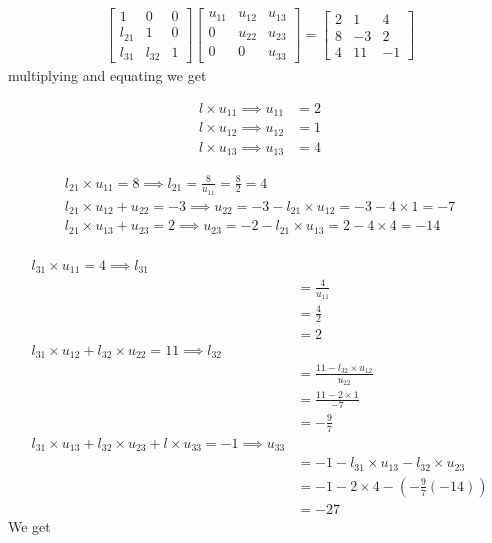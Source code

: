 \documentclass[a4paper, 12pt]{report}
\begin{document}
{\begin{eqnarray*}
\begin{bmatrix} 
	1& 0& 0\\
	l_{21}& 1& 0\\ 
	l_{31}& l_{32}& 1 
\end{bmatrix}
\begin{bmatrix}
	u_{11}& u_{12}& u_{13}\\
	0& u_{22}& u_{23}\\
	0& 0& u_{33}
\end{bmatrix}
=
\begin{bmatrix} 
	2& 1& 4\\
	8& -3& 2\\ 
	4& 11& -1 
\end{bmatrix}
\end{eqnarray*}
multiplying and equating we get

\begin{eqnarray*}
l\times u_{11}\implies \boxed{u_{11}}&=2\\ 
l\times u_{12}\implies \boxed{u_{12}}&=1\\
l\times u_{13}\implies \boxed{u_{13}}&=4
\end{eqnarray*}

\begin{eqnarray*}
l_{21}\times u_{11}=8\implies \boxed{l_{21}}=\frac{8}{u_{11}}=\frac{8}{2}=4\\ 
l_{21}\times u_{12}+u_{22}=-3\implies \boxed{u_{22}}=-3-l_{21}\times u_{12}=-3-4\times 1=-7\\
l_{21}\times u_{13}+u_{23}=2\implies \boxed{u_{23}}=-2-l_{21}\times u_{13}=2-4\times 4=-14\\
\end{eqnarray*}

\begin{align*}
l_{31}\times u_{11}=4\implies \boxed{l_{31}}\\
&=\frac{4}{u_{11}}\\
&=\frac{4}{2}\\
&=2\\
l_{31}\times u_{12}+l_{32}\times u_{22}=11\implies \boxed{l_{32}}\\
&=\frac{11- l_{32} \times u_{12}}{u_{22}}\\
&=\frac{11-2 \times 1}{-7}\\
&=-\frac{9}{7}\\
l_{31}\times u_{13}+l_{32}\times u_{23}+l\times u_{33}=-1\implies \boxed{u_{33}}\\
&=-1-l_{31}\times u_{13}-l_{32}\times u_{23}\\
&=-1-2\times 4-\left(-\frac{9}{7}(-14)\right)\\
&=-27
\end{align*}
We get

}
\end{document}
